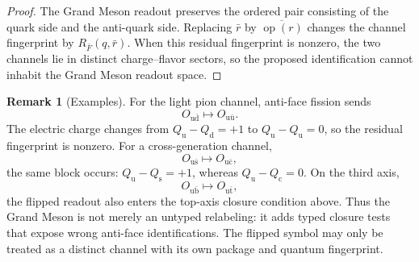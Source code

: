 \documentclass[11pt]{article}
\theoremstyle{definition}
\newtheorem{remark}[definition]{Remark}
\theoremstyle{plain}
\DeclareMathOperator{\op}{op}
\newcommand{\qu}{\mathrm u}
\newcommand{\qd}{\mathrm d}
\newcommand{\qc}{\mathrm c}
\newcommand{\qs}{\mathrm s}
\newcommand{\qt}{\mathrm t}
\newcommand{\qb}{\mathrm b}
\begin{document}
\begin{proof}
The Grand Meson readout preserves the ordered pair consisting of the quark
side and the anti-quark side.  Replacing \(\bar r\) by
\(\overline{\op(r)}\) changes the channel fingerprint by
\(R_{\bar F}(q,\bar r)\).  When this residual fingerprint is nonzero, the
two channels lie in distinct charge--flavor sectors, so the proposed
identification cannot inhabit the Grand Meson readout space.
\end{proof}

\begin{remark}[Examples]
For the light pion channel, anti-face fission sends
\[
  O_{\qu\bar{\qd}}
  \longmapsto
  O_{\qu\bar{\qu}} .
\]
The electric charge changes from \(Q_{\qu}-Q_{\qd}=+1\) to
\(Q_{\qu}-Q_{\qu}=0\), so the residual fingerprint is nonzero.  For a
cross-generation channel,
\[
  O_{\qu\bar{\qs}}
  \longmapsto
  O_{\qu\bar{\qc}},
\]
the same block occurs: \(Q_{\qu}-Q_{\qs}=+1\), whereas
\(Q_{\qu}-Q_{\qc}=0\).  On the third axis,
\[
  O_{\qu\bar{\qb}}
  \longmapsto
  O_{\qu\bar{\qt}},
\]
the flipped readout also enters the top-axis closure condition above.
Thus the Grand Meson is not merely an untyped relabeling: it adds typed
closure tests that expose wrong anti-face identifications.  The flipped
symbol may only be treated as a distinct channel with its own package and
quantum fingerprint.
\end{remark}
\end{document}
